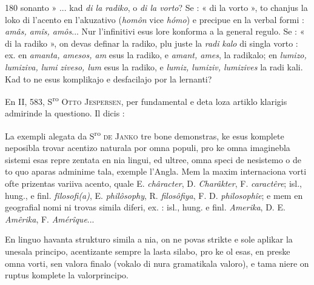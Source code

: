 \begin{VUpage}[184]{180}
\VUcontinue
sonanto » ... kad \textit{di la radiko}, o \textit{di la vorto}? Se : « di la\nl
vorto », to chanjus la loko di l'acento en l'akuzativo (\textit{homôn}\nl
vice \textit{hómo}) e precipue en la verbal formi : \textit{amâs, amîs, amôs}...\nl
Nur l'infinitivi esus lore konforma a la general regulo. Se :\nl
« di la radiko », on devas definar la radiko, plu juste la \textit{radi}\cc
\textit{kalo} di singla vorto : ex. en \textit{amanta, amesos, am} esus la\nl
radiko, e \textit{amant, ames}, la radikalo; en \textit{lumizo, lumiziva, lumi}\cc
\textit{ziveso, lum} esus la radiko, e \textit{lumiz, lumiziv, lumizives} la radi\cc
kali. Kad to ne esus komplikajo e desfacilajo por la lernanti?\parplein

En II, 583, S\textsuperscript{ro} \textsc{Otto Jespersen}, per fundamental e deta\cc
loza artiklo klarigis admirinde la questiono. Il dicis :

La exempli alegata da S\textsuperscript{ro} \textsc{de Janko} tre bone demonstras,\nl
ke esus komplete neposibla trovar acentizo naturala por\nl
omna populi, pro ke omna imaginebla sistemi esas repre\cc
zentata en nia lingui, ed ultree, omna speci de nesistemo o\nl
de to quo aparas adminime tala, exemple l'Angla. Mem la\nl
maxim internaciona vorti ofte prizentas variiva acento, quale\nl
E. \textit{châracter}, D. \textit{Charâkter}, F. \textit{caractêre}; isl., hung., e finl.\nl
\textit{fîlosofi(a)}, E. \textit{philôsophy}, R. \textit{filosôfiya}, F. D. \textit{philosophîe}; e\nl
mem en geografial nomi ni trovas simila diferi, ex. : isl., hung.\nl
e finl. \textit{Amerika}, D. E. \textit{Amêrika}, F. \textit{Amérîque}...

En linguo havanta strukturo simila a nia, on ne povas\nl
strikte e sole aplikar la unesala principo, acentizante sempre\nl
la lasta silabo, pro ke ol esas, en preske omna vorti, sen\cc
valora finalo (vokalo di nura gramatikala valoro), e tama\cc
niere on ruptus komplete la valorprincipo.


\end{VUpage}
